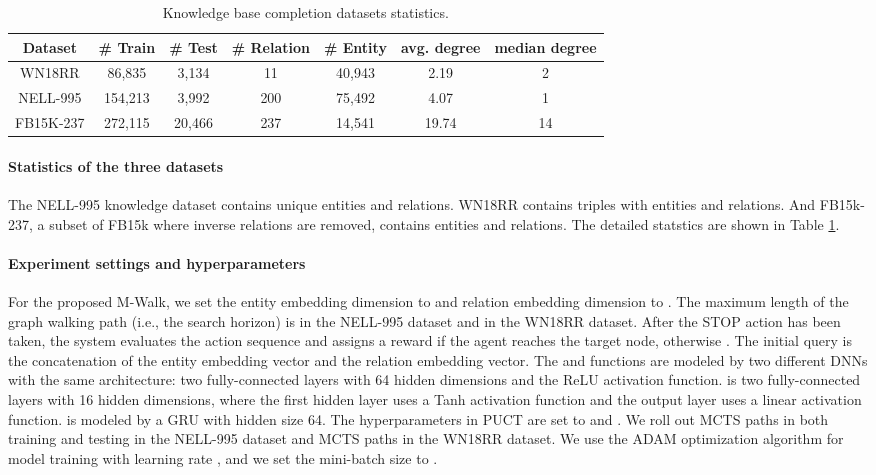 \documentclass{article}
\newcommand{\modelname}{M-Walk}
\begin{document}
\begin{table}[t]
\caption{Knowledge base completion datasets statistics.}
\label{tab:kbc_stats}
\centering
\begin{tabular}{c cccccc}
\toprule
Dataset  & \# Train & \# Test & \# Relation & \# Entity & avg. degree & median degree\\
\midrule
WN18RR & 86,835 & 3,134 & 11 & 40,943 &  2.19 & 2 \\
NELL-995 & 154,213 & 3,992 & 200 & 75,492 & 4.07 & 1 \\
FB15K-237 & 272,115 & 20,466 & 237 & 14,541 & 19.74 & 14\\
\bottomrule
\end{tabular}
\end{table}

\paragraph{Statistics of the three datasets}
The NELL-995 knowledge dataset contains  unique entities and  relations. 
WN18RR contains  triples with  entities and  relations. And FB15k-237, a subset of FB15k where inverse relations are removed, contains  entities and  relations. The detailed statstics are shown in Table \ref{tab:kbc_stats}.


\paragraph{Experiment settings and hyperparameters}
For the proposed \modelname, we set the entity embedding dimension to  and relation embedding dimension to .
The maximum length of the graph walking path (i.e., the search horizon) is  in the NELL-995 dataset and  in the WN18RR dataset.
After the STOP action has been taken, the system evaluates the action sequence and assigns a reward  if the agent reaches the target node, otherwise  .
The initial query  is the concatenation of the entity embedding vector and the relation embedding vector. 
The  and  functions are modeled by two different DNNs with the same architecture: two fully-connected layers with 64 hidden dimensions and the ReLU activation function.
 is two fully-connected layers with 16 hidden dimensions, where the first hidden layer uses a Tanh activation function and the output layer uses a linear activation function. 
 is modeled by a GRU with hidden size 64.
The hyperparameters in PUCT are set to  and . 
We roll out  MCTS paths in both training and testing in the NELL-995 dataset and  MCTS paths in the WN18RR dataset.
We use the ADAM optimization algorithm for model training with learning rate , and we set the mini-batch size to .
\end{document}
